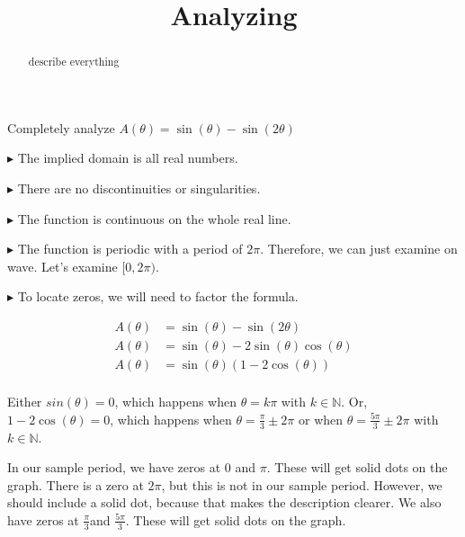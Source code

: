 \documentclass{ximera}
\title{Analyzing}
\begin{document}
\begin{abstract}
describe everything
\end{abstract}
\maketitle







Completely analyze $A(\theta) = \sin(\theta) - \sin(2\theta)$

$\blacktriangleright$  The implied domain is all real numbers.

$\blacktriangleright$  There are no discontinuities or singularities.

$\blacktriangleright$ The function is continuous on the whole real line.


$\blacktriangleright$ The function is periodic with a period of $2\pi$.  Therefore, we can just examine on wave.  Let's examine $[0,2\pi)$.






$\blacktriangleright$ To locate zeros, we will need to factor the formula.  




\begin{align*}
A(\theta)   &  = \sin(\theta) - \sin(2\theta)  \\
A(\theta)   &  = \sin(\theta) - 2\sin(\theta)\cos(\theta)   \\
A(\theta)   &  = \sin(\theta) (1 - 2\cos(\theta))   \\
\end{align*}



Either $sin(\theta) = 0$, which happens when $\theta = k\pi$ with $k \in \mathbb{N}$.
Or, $1 - 2\cos(\theta) = 0$, which happens when $\theta = \frac{\pi}{3} \pm 2\pi$ or when $\theta = \frac{5\pi}{3} \pm 2\pi$ with $k \in \mathbb{N}$.

In our sample period, we have zeros at $0$ and $\pi$. These will get solid dots on the  graph.  There is a zero at $2\pi$, but this is not in our sample period.  However, we should include a solid dot, because that makes the description clearer.  We also have zeros at $\frac{\pi}{3}$and $\frac{5\pi}{3}$.  These will get solid dots on the graph.
\end{document}
